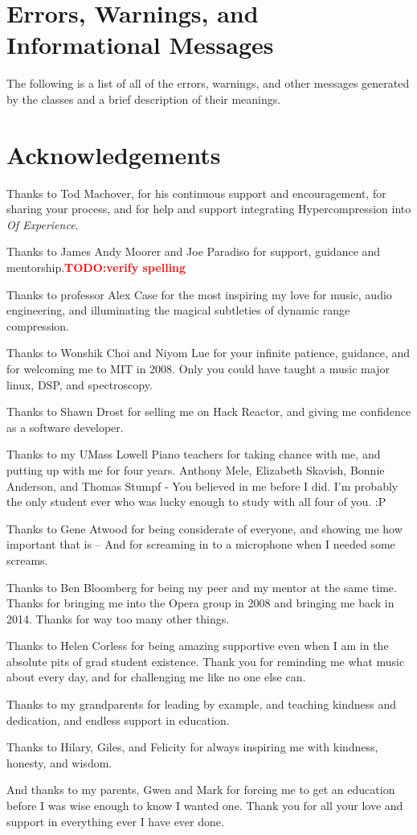 \documentclass{tufte-book}
\newcommand{\TODO}[1]{\textcolor{red}{\bf TODO:#1}\xspace}
\newcommand{\thesis}{Hypercompression\xspace}
\begin{document}
\section{Errors, Warnings, and Informational Messages}\label{sec:tl-messages}
The following is a list of all of the errors, warnings, and other messages generated by the classes and a brief description of their meanings.



\backmatter

\section*{Acknowledgements}
\label{sec:acknowledgements}

Thanks to Tod Machover, for his continuous support and encouragement,
for sharing your process, and for help and support integrating \thesis
into \textit{Of Experience}. 

Thanks to James Andy Moorer and Joe Paradiso for support, guidance and
mentorship.\TODO{verify spelling}

Thanks to professor Alex Case for the most inspiring my love for
music, audio engineering, and illuminating the magical subtleties of
dynamic range compression.

Thanks to Wonshik Choi and Niyom Lue for your infinite patience,
guidance, and for welcoming me to MIT in 2008. Only you could have
taught a music major linux, DSP, and spectroscopy.

Thanks to Shawn Drost for selling me on Hack Reactor, and giving me
confidence as a software developer. 

Thanks to my UMass Lowell Piano teachers for taking chance with me,
and putting up with me for four years. Anthony Mele, Elizabeth
Skavish, Bonnie Anderson, and Thomas Stumpf - You believed in me
before I did. I'm probably the only student ever who was lucky enough
to study with all four of you. :P

Thanks to Gene Atwood for being considerate of everyone, and showing
me how important that is -- And for screaming in to a microphone when
I needed some screams.

Thanks to Ben Bloomberg for being my peer and my mentor at the same
time. Thanks for bringing me into the Opera group in 2008 and bringing
me back in 2014. Thanks for way too many other things. 

Thanks to Helen Corless for being amazing supportive even when I am 
in the absolute pits of grad student existence. Thank you for
reminding me what music about every day, and for challenging me like
no one else can.

Thanks to my grandparents for leading by example, and teaching
kindness and dedication, and endless support in education.

Thanks to Hilary, Giles, and Felicity for always inspiring me with
kindness, honesty, and wisdom. 

And thanks to my parents, Gwen and Mark for forcing me to get an
education before I was wise enough to know I wanted one. Thank you for
all your love and support in everything ever I have ever done.



\end{document}
